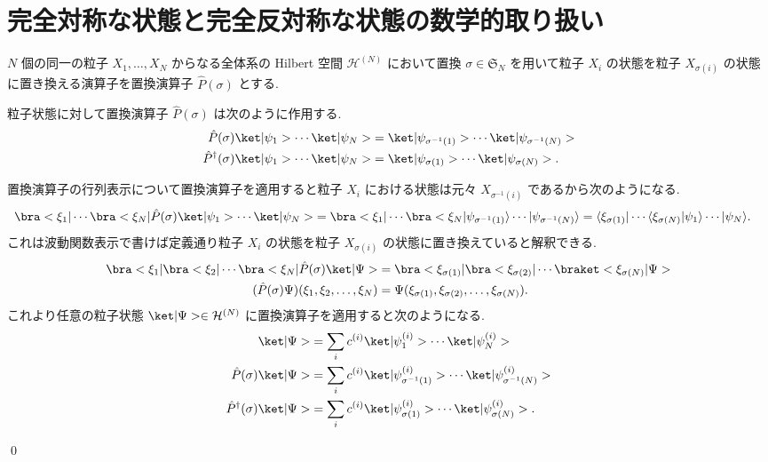 \documentclass[uplatex,dvipdfmx,a4paper,11pt]{jlreq}
\makeatletter
\newcommand{\HH}{\mathcal{H}}
\renewcommand{\SS}{\mathfrak{S}}
\numberwithin{equation}{section}
\theoremstyle{definition}
\renewenvironment{proof}[1][\proofname]{\par
  \normalfont
  \topsep6\p@\@plus6\p@ \trivlist
  \item[\hskip\labelsep{\bfseries #1}\@addpunct{\bfseries}]\ignorespaces\quad\par
}{
  \qed\endtrivlist\@endpefalse
}
\renewcommand\proofname{証明}
\makeatother
\begin{document}
\section{完全対称な状態と完全反対称な状態の数学的取り扱い}
\begin{definition}[置換演算子]
  $N$ 個の同一の粒子 $X_1,\ldots,X_N$ からなる全体系の Hilbert 空間 $\HH^{(N)}$ において置換 $\sigma\in\SS_N$ を用いて粒子 $X_i$ の状態を粒子 $X_{\sigma(i)}$ の状態に置き換える演算子を置換演算子 $\hat{P}(\sigma)$ とする.
\end{definition}
\begin{proposition}[Q21-9, Q21-10(i)(ii)]
  粒子状態に対して置換演算子 $\hat{P}(\sigma)$ は次のように作用する.
  \begin{align}
    \hat{P}(\sigma)\ket|\psi_1>\cdots\ket|\psi_N>         & = \ket|\psi_{\sigma^{-1}(1)}>\cdots\ket|\psi_{\sigma^{-1}(N)}> \\
    \hat{P}^\dagger(\sigma)\ket|\psi_1>\cdots\ket|\psi_N> & = \ket|\psi_{\sigma(1)}>\cdots\ket|\psi_{\sigma(N)}>.
  \end{align}
\end{proposition}
\begin{proof}
  置換演算子の行列表示について置換演算子を適用すると粒子 $X_i$ における状態は元々 $X_{\sigma^{-1}(i)}$ であるから次のようになる.
  \begin{align}
    \bra<\xi_1|\cdots\bra<\xi_N|\hat{P}(\sigma)\ket|\psi_1>\cdots\ket|\psi_N> & = \bra<\xi_1|\cdots\bra<\xi_N|\psi_{\sigma^{-1}(1)}\rangle\cdots|\psi_{\sigma^{-1}(N)}\rangle = \langle\xi_{\sigma(1)}|\cdots\langle\xi_{\sigma(N)}|\psi_1\rangle\cdots|\psi_N\rangle.
  \end{align}
  これは波動関数表示で書けば定義通り粒子 $X_i$ の状態を粒子 $X_{\sigma(i)}$ の状態に置き換えていると解釈できる.
  \begin{align}
    \bra<\xi_1|\bra<\xi_2|\cdots\bra<\xi_N|\hat{P}(\sigma)\ket|\Psi> & = \bra<\xi_{\sigma(1)}|\bra<\xi_{\sigma(2)}|\cdots\braket<\xi_{\sigma(N)}|\Psi> \\
    (\hat{P}(\sigma)\Psi)(\xi_1,\xi_2,\ldots,\xi_N)                  & = \Psi(\xi_{\sigma(1)},\xi_{\sigma(2)},\ldots,\xi_{\sigma(N)}).
  \end{align}
  これより任意の粒子状態 $\ket|\Psi>\in\HH^{(N)}$ に置換演算子を適用すると次のようになる.
  \begin{align}
    \ket|\Psi>                        & = \sum_{i}c^{(i)}\ket|\psi_1^{(i)}>\cdots\ket|\psi_N^{(i)}>                               \\
    \hat{P}(\sigma)\ket|\Psi>         & = \sum_{i}c^{(i)}\ket|\psi_{\sigma^{-1}(1)}^{(i)}>\cdots\ket|\psi_{\sigma^{-1}(N)}^{(i)}> \\
    \hat{P}^\dagger(\sigma)\ket|\Psi> & = \sum_{i}c^{(i)}\ket|\psi_{\sigma(1)}^{(i)}>\cdots\ket|\psi_{\sigma(N)}^{(i)}>.
  \end{align}
\end{proof}
\end{document}
